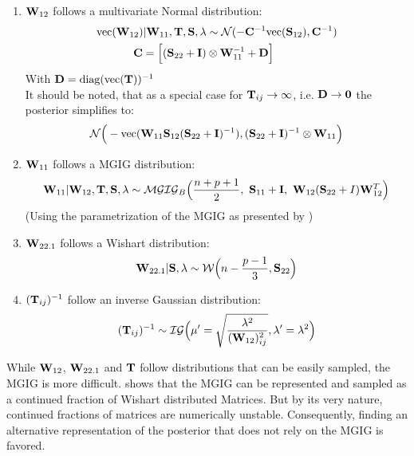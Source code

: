 \begin{tcolorbox}[colback=red!5!white,colframe=red!60!black, title= Posterior Conditional of $\Wxy$]
	\begin{enumerate}
		\item $\Wxy$ follows a multivariate Normal distribution:
		\begin{align}
		\text{vec}(\mathbf{W}_{12}) | \mathbf{W}_{11}, \mathbf{T}, \mathbf{S}, \lambda &\sim \mathcal{N}(-\mathbf{C}^{-1} \text{vec}(\mathbf{S}_{12}), \mathbf{C}^{-1})
		\\
		\mathbf{C} = \Big[
		(\mathbf{S}_{22} + \mathbf{I}) &\otimes \mathbf{W}_{11}^{-1} +\mathbf{D}\Big]
		\nonumber
		\end{align}
		With $\mathbf{D} = \text{diag}(\text{vec}(\mathbf{T}))^{-1}$\\
		It should be noted, that as a special case for $\mathbf{T}_{ij} \rightarrow \infty$, i.e.
		$\mathbf{D}\rightarrow \mathbf{0}$ the posterior simplifies to:
		$$
		\mathcal{N}\Big(-\text{vec}(\mathbf{W}_{11} \mathbf{S}_{12} (\mathbf{S}_{22}+\mathbf{I}) ^{-1}), 
		(\mathbf{S}_{22} + \mathbf{I})^{-1} \otimes \mathbf{W}_{11}
		\Big)
		$$
		\item $\mathbf{W}_{11}$ follows a \gls{MGIG} distribution:
		\begin{align}
		\Wxx | \Wxy, \matr{T}, \matr{S}, \lambda \sim 
		\mathcal{MGIG}_B
		\Big(
		\frac{n+p+1}{2}, \ 
		\Sxx+\matr{I},\  
		\Wxy(\Syy+I)\Wxy^T
		\Big)
		\end{align}
		(Using the parametrization of the \gls{MGIG} as presented by \citet{butler_generalized_1998})
		\item $\mathbf{W}_{22.1}$ follows a Wishart distribution:
		\begin{align}
		\mathbf{W}_{22.1} | \mathbf{S}, \lambda \sim \mathcal{W}\Big(
		n-\frac{p-1}{3}, \mathbf{S}_{22}
		\Big)
		\end{align}
		\item $(\mathbf{T}_{ij})^{-1}$ follow an inverse Gaussian distribution:
		\begin{align}
		(\mathbf{T}_{ij})^{-1} \sim \mathcal{IG}
		\Big(
		\mu' = \sqrt{
			\frac{\lambda^2}{(\mathbf{W}_{12})_{ij}^2}
		},
		\lambda' = \lambda^2
		\Big)
		\end{align}
	\end{enumerate}		
\end{tcolorbox}

While $\Wxy$, $\mathbf{W}_{22.1}$ and $\mathbf{T}$ follow distributions that can be easily sampled, the \gls{MGIG} is more difficult.
\citet{bernadac_random_1995} shows that the \gls{MGIG} can be represented and sampled as a continued fraction of Wishart distributed Matrices.
But by its very nature, continued fractions of matrices are numerically unstable.
Consequently, finding an alternative representation of the posterior that does not rely on the \gls{MGIG} is favored.


